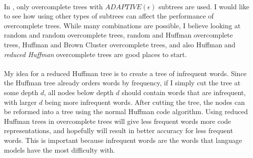 \paragraph{}
In \cite{MnihHinton2009}, only overcomplete trees with $ADAPTIVE(\epsilon)$ subtrees are used. I would like to see how using other types of subtrees can affect the performance of overcomplete trees. While many combinations are possible, I believe looking at random and random overcomplete trees, random and Huffman overcomplete trees, Huffman and Brown Cluster overcomplete trees, and also Huffman and \emph{reduced Huffman} overcomplete trees are good places to start.
\paragraph{}
My idea for a reduced Huffman tree is to create a tree of infrequent words. Since the Huffman tree already orders words by frequency, if I simply cut the tree at some depth $d$, all nodes below depth $d$ should contain words that are infrequent, with larger $d$ being more infrequent words. After cutting the tree, the nodes can be reformed into a tree using the normal Huffman code algorithm. Using reduced Huffman trees in overcomplete trees will give less frequent words more code representations, and hopefully will result in better accuracy for less frequent words. This is important because infrequent words are the words that language models have the most difficulty with.

